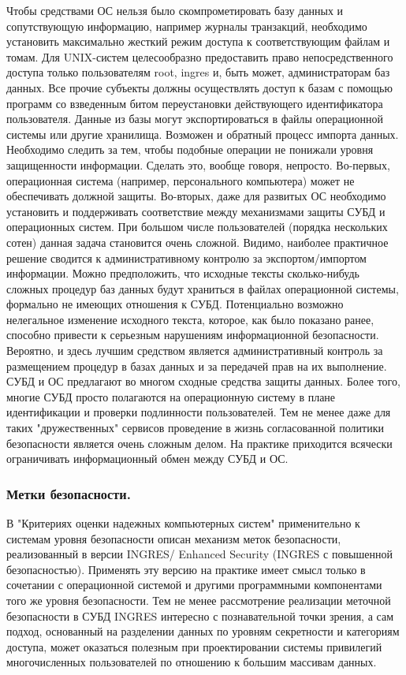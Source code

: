 Чтобы средствами ОС нельзя было скомпрометировать базу данных и сопутствующую информацию, например журналы транзакций, необходимо установить максимально жесткий режим доступа к соответствующим файлам и томам. Для UNIX-систем целесообразно предоставить право непосредственного доступа только пользователям root, ingres и, быть может, администраторам баз данных. Все прочие субъекты должны осуществлять доступ к базам с помощью программ со взведенным битом переустановки действующего идентификатора пользователя.
Данные из базы могут экспортироваться в файлы операционной системы или другие хранилища. Возможен и обратный процесс импорта данных. Необходимо следить за тем, чтобы подобные операции не понижали уровня защищенности информации. Сделать это, вообще говоря, непросто. Во-первых, операционная система (например, персонального компьютера) может не обеспечивать должной защиты. Во-вторых, даже для развитых ОС необходимо установить и поддерживать соответствие между механизмами защиты СУБД и операционных систем. При большом числе пользователей (порядка нескольких сотен) данная задача становится очень сложной. Видимо, наиболее практичное решение сводится к административному контролю за экспортом/импортом информации.
Можно предположить, что исходные тексты сколько-нибудь сложных процедур баз данных будут храниться в файлах операционной системы, формально не имеющих отношения к СУБД. Потенциально возможно нелегальное изменение исходного текста, которое, как было показано ранее, способно привести к серьезным нарушениям информационной безопасности. Вероятно, и здесь лучшим средством является административный контроль за размещением процедур в базах данных и за передачей прав на их выполнение.
СУБД и ОС предлагают во многом сходные средства защиты данных. Более того, многие СУБД просто полагаются на операционную систему в плане идентификации и проверки подлинности пользователей. Тем не менее даже для таких "дружественных" сервисов проведение в жизнь согласованной политики безопасности является очень сложным делом. На практике приходится всячески ограничивать информационный обмен между СУБД и ОС.
\subsubsection{ Метки безопасности.}


В "Критериях оценки надежных компьютерных систем" применительно к системам уровня безопасности описан механизм меток безопасности, реализованный в версии INGRES/ Enhanced Security (INGRES с повышенной безопасностью). Применять эту версию на практике имеет смысл только в сочетании с операционной системой и другими программными компонентами того же уровня безопасности. Тем не менее рассмотрение реализации меточной безопасности в СУБД INGRES интересно с познавательной точки зрения, а сам подход, основанный на разделении данных по уровням секретности и категориям доступа, может оказаться полезным при проектировании системы привилегий многочисленных пользователей по отношению к большим массивам данных.

